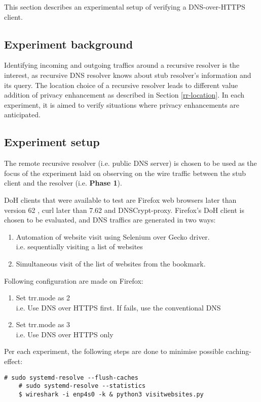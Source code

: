 This section describes an experimental setup of verifying a DNS-over-HTTPS client.

\subsection{Experiment background}
Identifying incoming and outgoing traffics around a recursive resolver is the interest, as recursive DNS resolver knows about stub resolver's information and its query.
The location choice of a recursive resolver leads to different value addition of privacy enhancement as described in Section \ref{rr-location}. In each experiment, it is aimed to verify situations where  privacy enhancements are anticipated.

\subsection{Experiment setup}\label{simulation}
The remote recursive resolver (i.e. public DNS server) is chosen to be used as the focus of the experiment laid on observing on the wire traffic between the stub client and the resolver (i.e. \textbf{Phase 1}).

DoH clients that were available to test are Firefox web browsers later than version 62 \cite{FirefoxDoH}, curl later than 7.62 \cite{CurlDoH} and DNSCrypt-proxy.
Firefox's DoH client is chosen to be evaluated, and DNS traffics are generated in two ways:
\begin{enumerate}
    \item Automation of website visit using Selenium over Gecko driver.
    \\i.e. sequentially visiting a list of websites
    \item Simultaneous visit of the list of websites from the bookmark.
\end{enumerate}
Following configuration are made on Firefox:
\begin{enumerate}
    \item Set trr.mode as 2
    \\i.e. Use DNS over HTTPS first. If fails, use the conventional DNS
    \item Set trr.mode as 3
    \\i.e. Use DNS over HTTPS only
\end{enumerate}
Per each experiment, the following steps are done to minimise possible caching-effect:
\begin{lstlisting}[basicstyle=\ttfamily]
    # sudo systemd-resolve --flush-caches
    # sudo systemd-resolve --statistics
    $ wireshark -i enp4s0 -k & python3 visitwebsites.py
\end{lstlisting}
